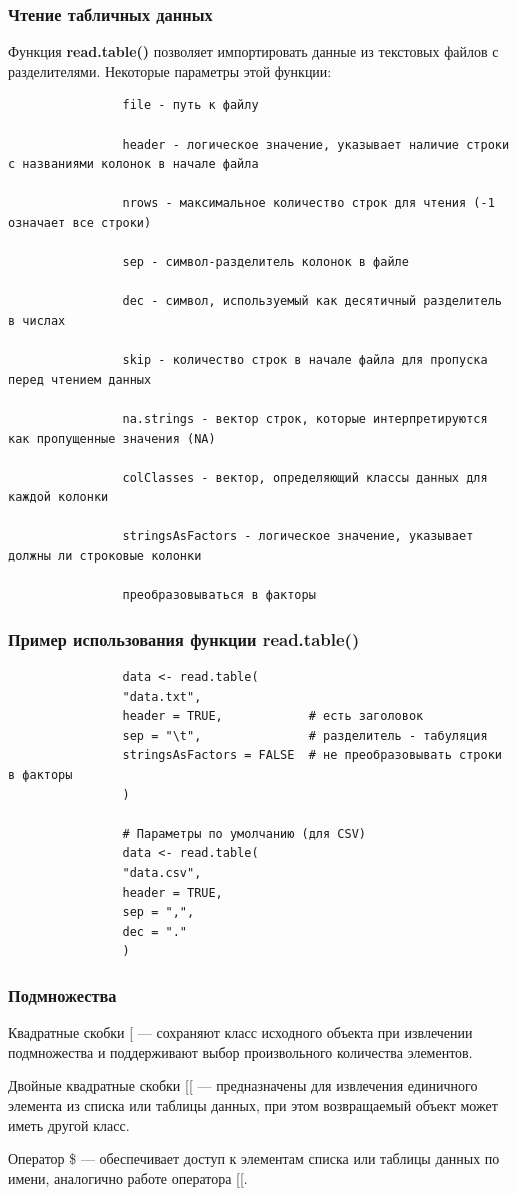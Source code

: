\documentclass[11pt,a4paper]{beamer}
\begin{document}
	
	\begin{frame}[fragile]
		\frametitle{Чтение табличных данных}
		Функция \textbf{read.table()} позволяет импортировать данные из текстовых файлов с разделителями. Некоторые параметры этой функции:
		{\fontsize{6}{7}\selectfont
			\begin{verbatim}
				file - путь к файлу
				
				header - логическое значение, указывает наличие строки с названиями колонок в начале файла
				
				nrows - максимальное количество строк для чтения (-1 означает все строки)
				
				sep - символ-разделитель колонок в файле
				
				dec - символ, используемый как десятичный разделитель в числах
				
				skip - количество строк в начале файла для пропуска перед чтением данных
				
				na.strings - вектор строк, которые интерпретируются как пропущенные значения (NA)
				
				colClasses - вектор, определяющий классы данных для каждой колонки
				
				stringsAsFactors - логическое значение, указывает должны ли строковые колонки 
				
				преобразовываться в факторы
			\end{verbatim}
		}
	\end{frame}
	
	
	\begin{frame}[fragile]
		\frametitle{Пример использования функции read.table()}
		{\fontsize{8}{10}\selectfont
			\begin{verbatim}
				data <- read.table(
				"data.txt", 
				header = TRUE,            # есть заголовок
				sep = "\t",               # разделитель - табуляция
				stringsAsFactors = FALSE  # не преобразовывать строки в факторы
				)		
				
				# Параметры по умолчанию (для CSV)
				data <- read.table(
				"data.csv", 
				header = TRUE,
				sep = ",",
				dec = "."
				)
			\end{verbatim}
		}
	\end{frame}
	
	
	\begin{frame}[fragile]
		\frametitle{Подмножества}
		Квадратные скобки [ — сохраняют класс исходного объекта при извлечении подмножества и поддерживают выбор произвольного количества элементов.
		
		Двойные квадратные скобки [[ — предназначены для извлечения единичного элемента из списка или таблицы данных, при этом возвращаемый объект может иметь другой класс.
		
		Оператор \$ — обеспечивает доступ к элементам списка или таблицы данных по имени, аналогично работе оператора [[.
		
		
		
	\end{frame}
	
\end{document}

